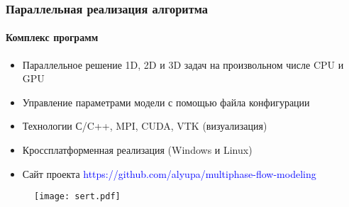 \begin{frame}
\begin{center}
\frametitle{Параллельная реализация алгоритма}
\framesubtitle{Комплекс программ}
\begin{minipage}{0.5\textwidth}
\begin{itemize}
\item Параллельное решение 1D, 2D и 3D задач на произвольном числе CPU и GPU
\vspace{2mm}
\item Управление параметрами модели с помощью файла конфигурации
\vspace{2mm}
\item Технологии С/C++, MPI, CUDA, VTK (визуализация)
\vspace{2mm}
\item Кроссплатформенная реализация (Windows и Linux)
\vspace{2mm}
\item Сайт проекта \textcolor{blue}{https://github.com/alyupa/multiphase-flow-modeling}
\end{itemize}
\end{minipage}
\hfill
\begin{minipage}{0.45\textwidth}
  \begin{figure}
    \vspace{-2mm}
    \texttt{[image: sert.pdf]}
  \end{figure}
\end{minipage}
\end{center}
\end{frame}